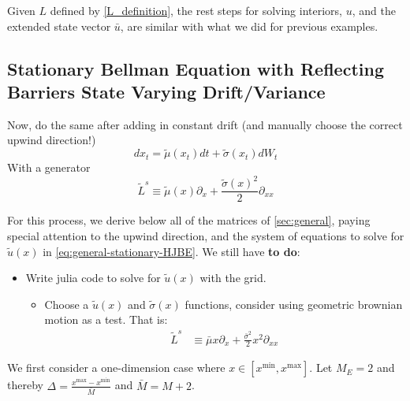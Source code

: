 \documentclass[11pt]{article}
\newcommand{\D}[1][]{\ensuremath{\partial_{#1}}}
\begin{document}

Given $L$ defined by \cref{L_definition}, the rest steps for solving interiors, $u$, and the extended state vector $\bar{u}$, are similar with what we did for previous examples.


\subsection{Stationary Bellman Equation with Reflecting Barriers State Varying Drift/Variance}
Now, do the same after adding in constant drift (and manually choose the correct upwind direction!)
$$
d x_t = \tilde{\mu}(x_t) dt + \tilde{\sigma}(x_t) d W_t
$$
With a generator
$$
\tilde{L}^s \equiv \tilde{\mu}(x) \D[x] + \frac{\tilde{\sigma}(x)^2}{2}\D[xx]
$$

For this process, we derive below all of the matrices of \cref{sec:general}, paying special attention to the upwind direction, and the system of equations to solve for $\tilde{u}(x)$ in \cref{eq:general-stationary-HJBE}. We still have \textbf{to do}:
\begin{itemize}
	\item Write julia code to solve for $\tilde{u}(x)$ with the grid.
	\begin{itemize}
		\item Choose a $\tilde{u}(x)$ and $\tilde{\sigma}(x)$ functions, consider using geometric brownian motion as a test.  That is:
		\begin{align}
		\tilde{L}^s &\equiv \bar{\mu} x \D[x] + \frac{\bar{\sigma}^2}{2}x^2\D[xx]
		\end{align}
	\end{itemize}
\end{itemize}

We first consider a one-dimension case where $x\in [x^{\min},x^{\max}]$. Let $M_E = 2$ and thereby $\Delta  = \frac{x^{\max}-x^{\min}}{\bar{M}}$ and $\bar{M} = M+2$.
\end{document}
